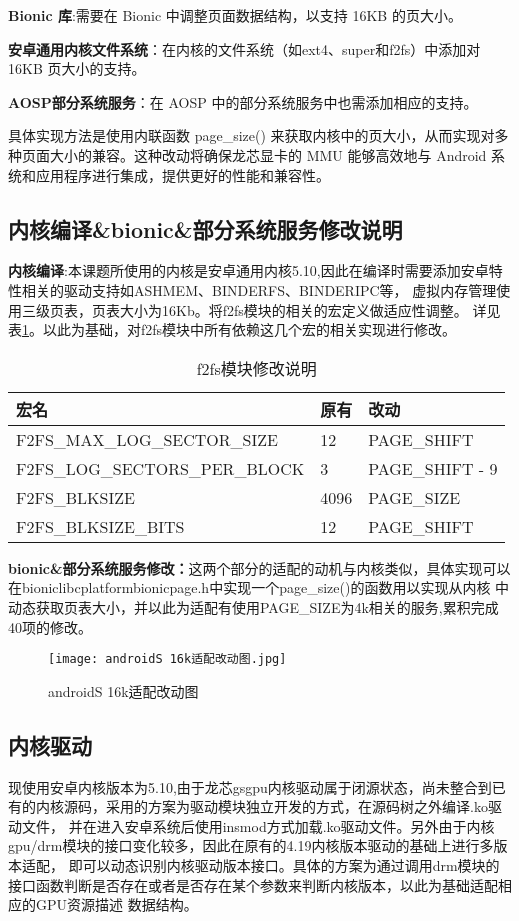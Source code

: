 \textbf{Bionic 库}:需要在 Bionic 中调整页面数据结构，以支持 16KB 的页大小。

\textbf{安卓通用内核文件系统}：在内核的文件系统（如ext4、super和f2fs）中添加对 16KB 页大小的支持。

\textbf{AOSP部分系统服务}：在 AOSP 中的部分系统服务中也需添加相应的支持。

具体实现方法是使用内联函数 page\_size() 来获取内核中的页大小，从而实现对多种页面大小的兼容。这种改动将确保龙芯显卡的 MMU 
能够高效地与 Android 系统和应用程序进行集成，提供更好的性能和兼容性。

\subsection{内核编译\&bionic\&部分系统服务修改说明}

\textbf{内核编译}:本课题所使用的内核是安卓通用内核5.10,因此在编译时需要添加安卓特性相关的驱动支持如ASHMEM、BINDERFS、BINDERIPC等，
虚拟内存管理使用三级页表，页表大小为16Kb。将f2fs模块的相关的宏定义做适应性调整。
详见表\ref{tab:f2fs模块修改说明}。以此为基础，对f2fs模块中所有依赖这几个宏的相关实现进行修改。
\begin{table}[h]
  \centering
  \caption{f2fs模块修改说明}
  \label{tab:f2fs模块修改说明}
  \begin{tabular}{lll}
    \toprule
    宏名   &   原有  &改动  \\
    \midrule
    F2FS\_MAX\_LOG\_SECTOR\_SIZE & 12 & PAGE\_SHIFT \\
    F2FS\_LOG\_SECTORS\_PER\_BLOCK & 3 & PAGE\_SHIFT - 9 \\
    F2FS\_BLKSIZE & 4096 & PAGE\_SIZE \\
    F2FS\_BLKSIZE\_BITS & 12 & PAGE\_SHIFT \\
    \bottomrule
  \end{tabular}
  \note{}
\end{table}

\textbf{bionic\&部分系统服务修改：}这两个部分的适配的动机与内核类似，具体实现可以在bionic\/libc\/platform\/bionic\/page.h中实现一个page\_size()的函数用以实现从内核
中动态获取页表大小，并以此为适配有使用PAGE\_SIZE为4k相关的服务,累积完成40项的修改。
\begin{figure}[h]
  \centering
  \texttt{[image: androidS 16k适配改动图.jpg]}
  \caption{androidS 16k适配改动图}
\end{figure}

\subsection{内核驱动}
现使用安卓内核版本为5.10,由于龙芯gsgpu内核驱动属于闭源状态，尚未整合到已有的内核源码，采用的方案为驱动模块独立开发的方式，在源码树之外编译.ko驱动文件，
并在进入安卓系统后使用insmod方式加载.ko驱动文件。另外由于内核gpu/drm模块的接口变化较多，因此在原有的4.19内核版本驱动的基础上进行多版本适配，
即可以动态识别内核驱动版本接口。具体的方案为通过调用drm模块的接口函数判断是否存在或者是否存在某个参数来判断内核版本，以此为基础适配相应的GPU资源描述
数据结构。

